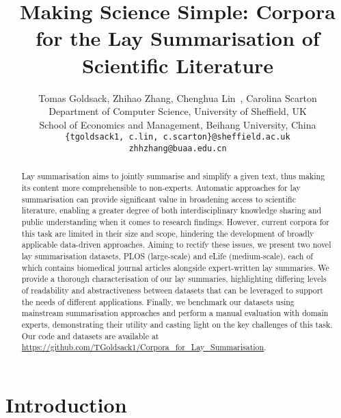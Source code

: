 \documentclass[11pt]{article}
\title{Making Science Simple: Corpora for the Lay Summarisation of Scientific Literature}
\author{Tomas Goldsack, Zhihao Zhang, Chenghua Lin\footnotemark[1]~, Carolina Scarton \\
        Department of Computer Science, University of Sheffield, UK \\ 
        School of Economics and Management, Beihang University, China\\
\texttt{\{tgoldsack1, c.lin, c.scarton\}@sheffield.ac.uk}\\
\texttt{zhhzhang@buaa.edu.cn}}
\begin{document}
\maketitle


\begin{abstract}




Lay summarisation aims to jointly summarise and simplify a given text, thus making its content more comprehensible to non-experts.
Automatic approaches for lay summarisation can provide significant value in broadening access to scientific literature, enabling a greater degree of both interdisciplinary knowledge sharing and public understanding when it comes to research findings. However, current corpora for this task are limited in their size and scope, hindering the development of broadly applicable data-driven approaches. 
Aiming to rectify these issues, we present two novel lay summarisation datasets, PLOS (large-scale) and eLife (medium-scale), each of which contains biomedical journal articles alongside expert-written lay summaries.
We provide a thorough characterisation of our lay summaries, 
highlighting differing levels of readability and abstractiveness
between datasets that can be leveraged to support the needs of different applications.
Finally, we benchmark our datasets using mainstream summarisation approaches and perform a manual evaluation with domain experts, demonstrating their utility and casting light on the key challenges of this task. 
Our code and datasets are available at \url{https://github.com/TGoldsack1/Corpora_for_Lay_Summarisation}.
\end{abstract}
 \section{Introduction}
\end{document}
